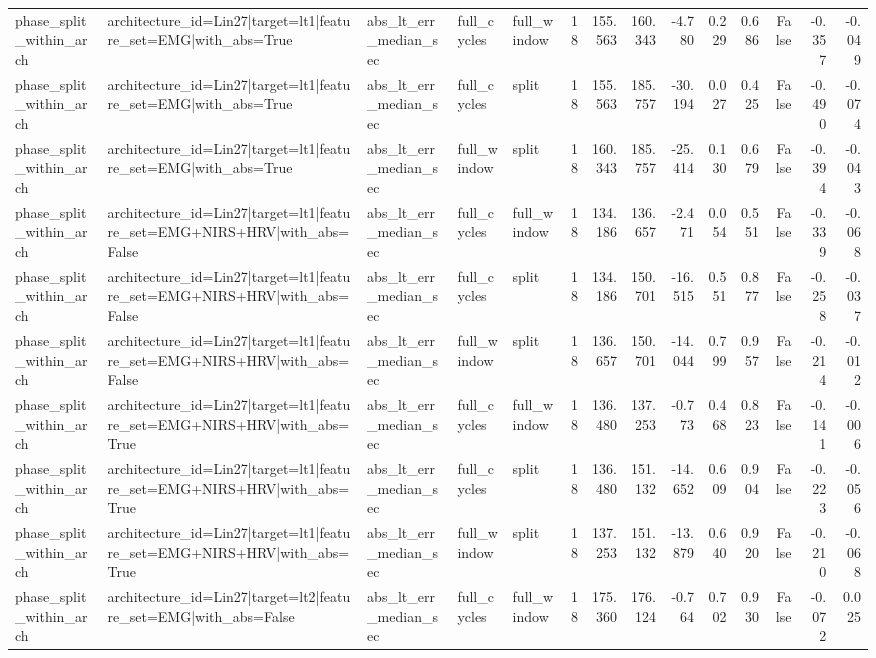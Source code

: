 \begin{table}
\begin{tabular}{lllllrrrrrrrrr}
phase_split_within_arch & architecture_id=Lin27|target=lt1|feature_set=EMG|with_abs=True & abs_lt_err_median_sec & full_cycles & full_window & 18 & 155.563 & 160.343 & -4.780 & 0.229 & 0.686 & False & -0.357 & -0.049 \\
phase_split_within_arch & architecture_id=Lin27|target=lt1|feature_set=EMG|with_abs=True & abs_lt_err_median_sec & full_cycles & split & 18 & 155.563 & 185.757 & -30.194 & 0.027 & 0.425 & False & -0.490 & -0.074 \\
phase_split_within_arch & architecture_id=Lin27|target=lt1|feature_set=EMG|with_abs=True & abs_lt_err_median_sec & full_window & split & 18 & 160.343 & 185.757 & -25.414 & 0.130 & 0.679 & False & -0.394 & -0.043 \\
phase_split_within_arch & architecture_id=Lin27|target=lt1|feature_set=EMG+NIRS+HRV|with_abs=False & abs_lt_err_median_sec & full_cycles & full_window & 18 & 134.186 & 136.657 & -2.471 & 0.054 & 0.551 & False & -0.339 & -0.068 \\
phase_split_within_arch & architecture_id=Lin27|target=lt1|feature_set=EMG+NIRS+HRV|with_abs=False & abs_lt_err_median_sec & full_cycles & split & 18 & 134.186 & 150.701 & -16.515 & 0.551 & 0.877 & False & -0.258 & -0.037 \\
phase_split_within_arch & architecture_id=Lin27|target=lt1|feature_set=EMG+NIRS+HRV|with_abs=False & abs_lt_err_median_sec & full_window & split & 18 & 136.657 & 150.701 & -14.044 & 0.799 & 0.957 & False & -0.214 & -0.012 \\
phase_split_within_arch & architecture_id=Lin27|target=lt1|feature_set=EMG+NIRS+HRV|with_abs=True & abs_lt_err_median_sec & full_cycles & full_window & 18 & 136.480 & 137.253 & -0.773 & 0.468 & 0.823 & False & -0.141 & -0.006 \\
phase_split_within_arch & architecture_id=Lin27|target=lt1|feature_set=EMG+NIRS+HRV|with_abs=True & abs_lt_err_median_sec & full_cycles & split & 18 & 136.480 & 151.132 & -14.652 & 0.609 & 0.904 & False & -0.223 & -0.056 \\
phase_split_within_arch & architecture_id=Lin27|target=lt1|feature_set=EMG+NIRS+HRV|with_abs=True & abs_lt_err_median_sec & full_window & split & 18 & 137.253 & 151.132 & -13.879 & 0.640 & 0.920 & False & -0.210 & -0.068 \\
phase_split_within_arch & architecture_id=Lin27|target=lt2|feature_set=EMG|with_abs=False & abs_lt_err_median_sec & full_cycles & full_window & 18 & 175.360 & 176.124 & -0.764 & 0.702 & 0.930 & False & -0.072 & 0.025 \\

\end{tabular}
\end{table}
